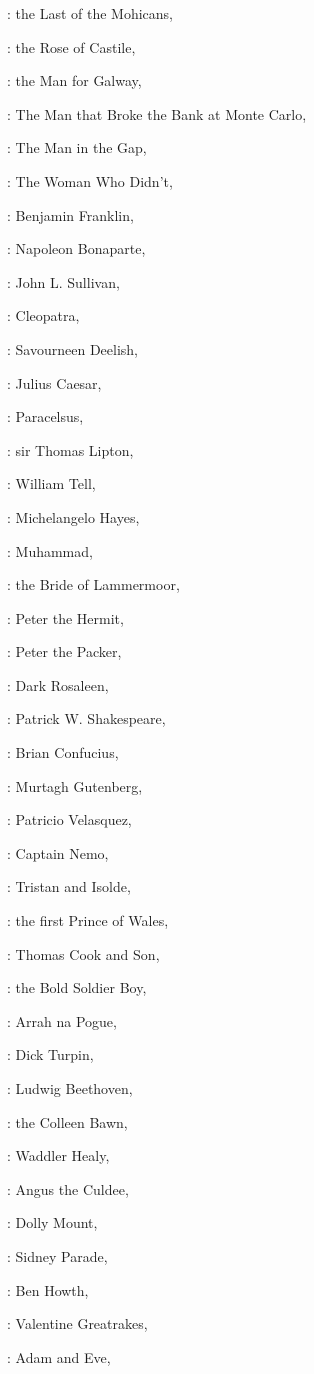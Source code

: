 :
the Last of the Mohicans,

:
the Rose of Castile,

:
the Man for Galway,

:
The Man that Broke the Bank at Monte Carlo,

:
The Man in the Gap,

:
The Woman Who Didn't,

:
Benjamin Franklin,

:
Napoleon Bonaparte,

:
John L. Sullivan,

:
Cleopatra,

:
Savourneen Deelish,

:
Julius Caesar,

:
Paracelsus,

:
sir Thomas Lipton,

:
William Tell,

:
Michelangelo Hayes,

:
Muhammad,

:
the Bride of Lammermoor,

:
Peter the Hermit,

:
Peter the Packer,

:
Dark Rosaleen,

:
Patrick W. Shakespeare,

:
Brian Confucius,

:
Murtagh Gutenberg,

:
Patricio Velasquez,

:
Captain Nemo,

:
Tristan and Isolde,

:
the first Prince of Wales,

:
Thomas Cook and Son,

:
the Bold Soldier Boy,

:
Arrah na Pogue,

:
Dick Turpin,

:
Ludwig Beethoven,

:
the Colleen Bawn,

:
Waddler Healy,

:
Angus the Culdee,

:
Dolly Mount,

:
Sidney Parade,

:
Ben Howth,

:
Valentine Greatrakes,

:
Adam and Eve,


